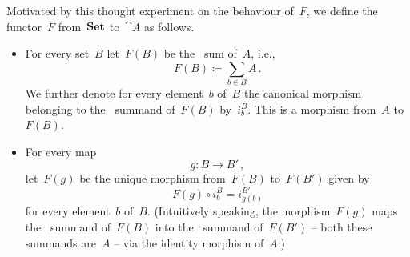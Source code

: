Motivated by this thought experiment on the behaviour of~$F$, we define the functor~$F$ from~$\mathbf{Set}$ to~$\cat{A}$ as follows.
\begin{itemize}

	\item
		For every set~$B$ let~$F(B)$ be the~ sum of~$A$, i.e.,
		\[
			F(B) ≔ ∑_{b ∈ B} A \,.
		\]
		We further denote for every element~$b$ of~$B$ the canonical morphism belonging to the~ summand of~$F(B)$ by~$i^B_b$.
		This is a morphism from~$A$ to~$F(B)$.

	\item
		For every map
		\[
			g \colon B \to B' \,,
		\]
		let~$F(g)$ be the unique morphism from~$F(B)$ to~$F(B')$ given by
		\[
			F(g) ∘ i^B_b
			=
			i^{B'}_{g(b)}
		\]
		for every element~$b$ of~$B$.
		(Intuitively speaking, the morphism~$F(g)$ maps the~ summand of~$F(B)$ into the~ summand of~$F(B')$ -- both these summands are~$A$ -- via the identity morphism of~$A$.)

\end{itemize}

